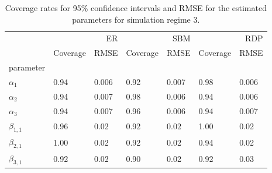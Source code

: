 \begin{table}[ht]
\centering
\caption{Coverage rates for 95\% confidence intervals and RMSE for the estimated parameters for simulation regime 3.}
\label{tab:regime_3_params}
\begin{tabular}{lllllll}
\toprule
 & \multicolumn{2}{r}{ER} & \multicolumn{2}{r}{SBM} & \multicolumn{2}{r}{RDP} \\
 & Coverage & RMSE & Coverage & RMSE & Coverage & RMSE \\
parameter &  &  &  &  &  &  \\
\midrule
$\alpha_{1}$ & 0.94 & 0.006 & 0.92 & 0.007 & 0.98 & 0.006 \\
$\alpha_{2}$ & 0.94 & 0.007 & 0.98 & 0.006 & 0.94 & 0.006 \\
$\alpha_{3}$ & 0.94 & 0.007 & 0.96 & 0.006 & 0.94 & 0.007 \\
$\beta_{1,1}$ & 0.96 & 0.02 & 0.92 & 0.02 & 1.00 & 0.02 \\
$\beta_{2,1}$ & 1.00 & 0.02 & 0.92 & 0.02 & 0.94 & 0.02 \\
$\beta_{3,1}$ & 0.92 & 0.02 & 0.90 & 0.02 & 0.92 & 0.03 \\
\bottomrule
\end{tabular}

\end{table}
